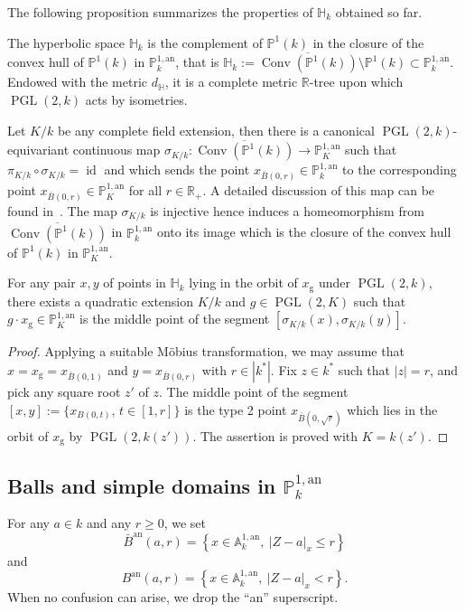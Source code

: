 \documentclass[10pt]{amsart}
\theoremstyle{definition}\newtheorem{defi}[theo]{Definition}\newtheorem{rema}[theo]{Remark}\newtheorem{exam}[theo]{Example}\newtheorem{exem}[theo]{Example}\newtheorem{nota}[theo]{Notation}
\DeclareMathOperator{\conv}{Conv}
\DeclareMathOperator{\id}{id}
\DeclareMathOperator{\PGL}{PGL}
\newcommand{\hh}{\mathbb{H}}
\newcommand{\A}{{\mathbb A}}
\newcommand{\R}{{\mathbb R}}
\newcommand{\an}{\mathrm{an}}
\newcommand{\set}[1]{\left\{#1\right\}}
\newcommand{\abs}[1]{\left\vert#1\right\vert}
\newcommand{\PP}{\mathbb{P}}
\newcommand{\PGLk}{\PGL(2, k)}
\begin{document}
The following proposition summarizes the properties of $\hh_k$ obtained so far.

\begin{prop}
The hyperbolic space $\hh_k$ is the complement of $\PP^1(k)$ in the closure of the convex hull of $\PP^1(k)$ in $\PP^{1,\an}_{k}$, that is $\hh_k:= \overline{\conv(\PP^1(k))}\setminus \PP^1(k)\subset \PP^{1,\an}_k$. Endowed with the metric $d_\hh$, it is a complete metric $\R$-tree upon which $\PGLk$ acts by isometries.
\end{prop}

Let $K/k$ be any complete field extension, then there is a canonical $\PGL(2,k)$-equivariant continuous map $\sigma_{K/k} : \overline{\conv(\PP^1(k))} \to \PP^{1,\an}_K$ such that $\pi_{K/k} \circ \sigma_{K/k} = \id$ and which sends the point $x_{\bar{B}(0,r)}\in\PP^{1,\an}_k$ to the corresponding point $x_{\bar{B}(0,r)}\in \PP^{1,\an}_K$ for all $r\in \R_+$. A detailed discussion of this map can be found in~\cite{poineau}. The map $\sigma_{K/k}$ is injective hence induces a homeomorphism from $\overline{\conv(\PP^1(k))}$ in $ \PP^{1,\an}_k$ onto its image which is the closure of the convex hull of $ \PP^1(k)$ in $ \PP^{1,\an}_K$.

\begin{prop}\label{prop:quadratic}
For any pair $x, y$ of points in $ \hh_k$ lying in the orbit of $x_{\mathrm{g}}$ under $\PGL(2,k)$, there exists a quadratic extension $K/k$ and $g\in \PGL(2,K)$ such that $g\cdot x_{\mathrm{g}}\in \PP^{1,\an}_K$ is the middle point of the segment $[\sigma_{K/k}(x),\sigma_{K/k}(y)]$.
\end{prop}

\begin{proof}
Applying a suitable M\"obius transformation, we may assume that $x= x_{\mathrm{g}} =x_{\bar{B}(0,1)}$ and $y = x_{\bar{B}(0,r)}$ with $r\in |k^*|$. Fix $z\in k^*$ such that $|z| = r$, and pick any square root $z'$ of $z$. The middle point of the segment $[x,y]:= \{x_{B(0,t)}, \, t \in [1,r]\}$ is the type 2 point $x_{\bar B(0, \sqrt{r})}$ which lies in the orbit of $x_{\mathrm{g}}$ by $\PGL(2,k(z'))$. The assertion is proved with $K=k(z')$.
\end{proof}

\subsection{Balls and simple domains in \texorpdfstring{$\PP^{1, \an}_k$}{PP1, ank}}

For any $a\in k$ and any $r\geq 0$, we set
\begin{equation}\label{eq:ball1}
\bar{B}^\an(a, r) = \set{x\in \A^{1, \an}_k, \ \abs{Z-a}_x \leq r}
\end{equation}
and
\begin{equation}\label{eq:ball2}
B^\an(a, r) = \set{x\in \A^{1, \an}_k, \ \abs{Z-a}_x < r}.
\end{equation}
When no confusion can arise, we drop the ``an'' superscript.
\end{document}
